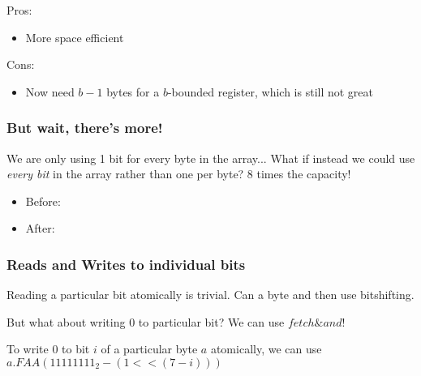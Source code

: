 \documentclass{beamer}
\begin{document}
\begin{frame}
Pros:
\begin{itemize}
	\item More space efficient
\end{itemize}
Cons:
\begin{itemize}
	\item Now need $b-1$ bytes for a $b$-bounded register, which is still not great
\end{itemize}
\end{frame}
\begin{frame}[fragile]
\frametitle{But wait, there's more!}
We are only using 1 bit for every byte in the array...
What if instead we could use \emph{every bit} in the array rather than one per byte?
8 times the capacity!
\begin{itemize}
\item Before:
\\

\item After:
\\
\end{itemize}
\end{frame}
\begin{frame}[fragile]
\frametitle{Reads and Writes to individual bits}
Reading a particular bit atomically is trivial. Can a byte and then use bitshifting.

But what about writing 0 to particular bit? We can use $fetch\&and$!

To write 0 to bit $i$ of a particular byte $a$ atomically, we can use $a.FAA(11111111_2 - (1 << (7 - i)))$ 
\end{frame}
\end{document}

